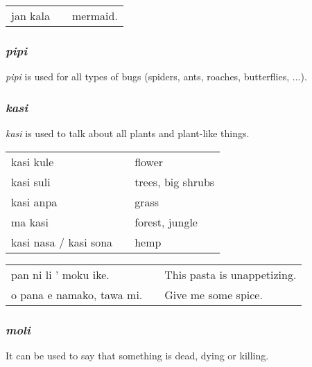 \begin{supertabular}{p{5,5cm}|ll}
jan kala && mermaid. \\
\end{supertabular} 
%
%
\subsubsection*{\textit{pipi}}
%
%
\textit{pipi} is used for all types of bugs (spiders, ants, roaches, butterflies, ...). 
%
%
\subsubsection*{\textit{kasi}}
%
%
\textit{kasi} is used to talk about all plants and plant-like things. 

\begin{supertabular}{p{5,5cm}|ll}
kasi kule && flower \\
kasi suli && trees, big shrubs \\
kasi anpa && grass \\
ma kasi && forest, jungle \\
kasi nasa / kasi sona && hemp  \\
\end{supertabular} 
%

%
\begin{supertabular}{p{5,5cm}|ll}
pan ni li ' moku ike. && This pasta is unappetizing. \\
o pana e namako, tawa mi. &&   Give me some spice. \\
\end{supertabular} 
%
%
\subsubsection*{\textit{moli}}
%
%
It can be used to say that something is dead, dying or killing.

